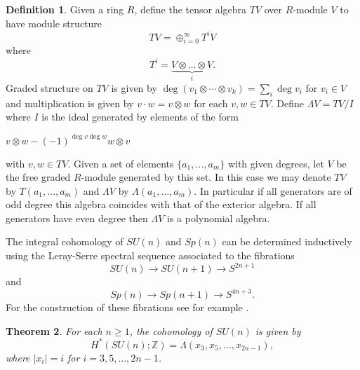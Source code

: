 \documentclass{article}
\theoremstyle{plain}
\newtheorem{thm}{Theorem}[section]
\theoremstyle{definition}
\newtheorem{defn}[thm]{Definition}
\numberwithin{thm}{section}
\begin{document}
		
		\begin{defn}
			Given a ring $R$, define the tensor algebra $TV$ over $R$-module $V$ to have module structure
			\begin{equation*}
				TV={\oplus}^{\infty}_{i=0}T^{i}V
			\end{equation*}
			where 
			\begin{equation*}
				T^{i}=\underbrace{V \otimes \dots \otimes V}_\text{$i$}.
			\end{equation*}
			Graded structure on $TV$ is given by $\deg{(v_{1}\otimes \cdots \otimes v_{k})=\sum_{i}{\deg v_{i}}}$ for $v_{i} \in V$ and
			multiplication is given by $v\cdot w=v \otimes w$ for each $v,w \in TV$.
			Define $\Lambda V=TV/I$ where $I$ is the ideal generated by elements of the form 
			\begin{center}
				$v\otimes w-(-1)^{\deg{v}\deg{w}} w \otimes v$ 
			\end{center}
			with $v,w \in TV$.
			Given a set of elements $\{ a_{1},\dots,a_{m} \}$ with given degrees, let $V$ be the free graded $R$-module generated by this set.
			In this case we may denote $TV$ by $T(a_{1},\dots,a_{m})$ and $\Lambda V$ by $\Lambda (a_{1},\dots,a_{m})$.
			In particular if all generators are of odd degree this algebra coincides with that of the exterior algebra.
			If all generators have even degree then $\Lambda V$ is a polynomial algebra.
		\end{defn}
		
		
		The integral cohomology of $SU(n)$ and $Sp(n)$ can be determined inductively using the Leray-Serre spectral sequence associated to the fibrations
		\begin{equation}\label{eq:FibeSU}
			SU(n)\to SU(n+1) \to S^{2n+1}
		\end{equation}
		and
		\begin{equation}\label{eq:FibeSp}
			Sp(n)\to Sp(n+1) \to S^{4n+3}.
		\end{equation}
		For the construction of these fibrations see for example \cite[\S 3.4]{Arkowitz}.
		
		\begin{thm}\label{thm:H*(SU(n))}
			For each $n\geq 1$, the cohomology of $SU(n)$ is given by
			\begin{equation*}
				H^*(SU(n);\mathbb{Z})=\Lambda(x_3,x_5,\dots,x_{2n-1}),
			\end{equation*}
			where $|x_i|=i$ for $i=3,5,\dots,2n-1$.
		\end{thm}
		
\end{document}
